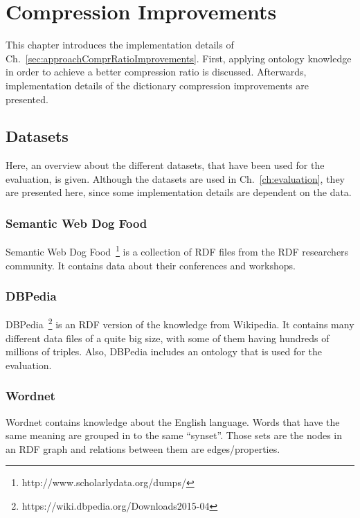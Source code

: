 \section{Compression Improvements}\label{sec:implementationComprRatioImprovements}

This chapter introduces the implementation details of Ch.~\ref{sec:approachComprRatioImprovements}. First, applying ontology knowledge in order to achieve a better compression ratio is discussed. Afterwards, implementation details of the dictionary compression improvements are presented.

\subsection{Datasets}\label{sec:implementationDatasets}

Here, an overview about the different datasets, that have been used for the evaluation, is given. Although the datasets are used in Ch.~\ref{ch:evaluation}, they are presented here, since some implementation details are dependent on the data.

\subsubsection{Semantic Web Dog Food}

Semantic Web Dog Food~\footnote{http://www.scholarlydata.org/dumps/} is a collection of RDF files from the RDF researchers community. It contains data about their conferences and workshops.

\subsubsection{DBPedia}

DBPedia~\footnote{https://wiki.dbpedia.org/Downloads2015-04} is an RDF version of the knowledge from Wikipedia. It contains many different data files of a quite big size, with some of them having hundreds of millions of triples. Also, DBPedia includes an ontology that is used for the evaluation.

\subsubsection{Wordnet}

Wordnet contains knowledge about the English language. Words that have the same meaning are grouped in to the same \enquote{synset}. Those sets are the nodes in an RDF graph and relations between them are edges/properties.

